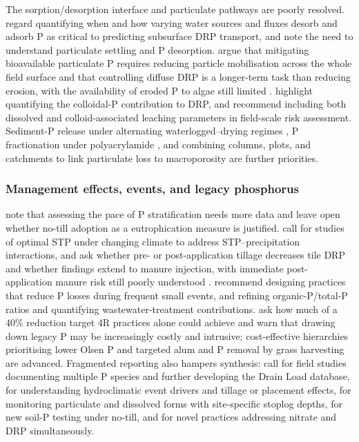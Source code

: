 The sorption/desorption interface and particulate pathways are poorly resolved.
\textcite{Mumbi2025} regard quantifying when and how varying water sources and
fluxes desorb and adsorb P as critical to predicting subsurface DRP transport,
and \textcite{Flores2021} note the need to understand particulate settling and
P desorption. \textcite{Uusitalo2003} argue that mitigating bioavailable
particulate P requires reducing particle mobilisation across the whole field
surface and that controlling diffuse DRP is a longer-term task than reducing
erosion, with the availability of eroded P to algae still limited
\parencite{Ulén2007}. \textcite{Wilson2019} highlight quantifying the colloidal-P
contribution to DRP, and \textcite{Norgaard2013} recommend including both
dissolved and colloid-associated leaching parameters in field-scale risk
assessment. Sediment-P release under alternating waterlogged--drying regimes
\parencite{Nguyen2002}, P fractionation under polyacrylamide \parencite{Jiang2010},
and combining columns, plots, and catchments to link particulate loss to
macroporosity \parencite{Laubel1999} are further priorities.

\subsubsection{Management effects, events, and legacy phosphorus}

\textcite{Uusitalo2018} note that assessing the pace of P stratification needs
more data and leave open whether no-till adoption as a eutrophication measure is
justified. \textcite{Ni2020} call for studies of optimal STP under changing
climate to address STP--precipitation interactions, and \textcite{Wang2018} ask
whether pre- or post-application tillage decreases tile DRP and whether findings
extend to manure injection, with immediate post-application manure risk still
poorly understood \parencite{Madison2014}. \textcite{Brendel2019} recommend
designing practices that reduce P losses during frequent small events, and
\textcite{Schilling2017b} refining organic-P/total-P ratios and quantifying
wastewater-treatment contributions. \textcite{Jarvie2017} ask how much of a 40\%
reduction target 4R practices alone could achieve and warn that drawing down
legacy P may be increasingly costly and intrusive; cost-effective hierarchies
prioritising lower Olsen P and targeted alum \parencite{McDowell2015} and P
removal by grass harvesting \parencite{Zhang2015b} are advanced. Fragmented
reporting also hampers synthesis: \textcite{Christianson2016} call for field
studies documenting multiple P species and further developing the Drain Load
database, \textcite{Macrae2019} for understanding hydroclimatic event drivers
and tillage or placement effects, \textcite{Tanga2025} for monitoring
particulate and dissolved forms with site-specific stoplog depths,
\textcite{Zhang2017} for new soil-P testing under no-till, and \textcite{Spiese2023}
for novel practices addressing nitrate and DRP simultaneously.


